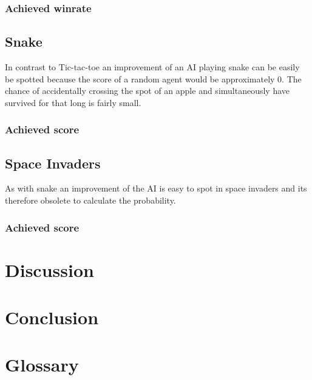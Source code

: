 \documentclass[12pt]{article}
\begin{document}
\subsubsection{Achieved winrate}
\subsection{Snake}
In contrast to Tic-tac-toe an improvement of an AI playing snake can be easily be spotted because the score of a random agent would be approximately $0$. The chance of accidentally crossing the spot of an apple and simultaneously have survived for that long is fairly small.   
\subsubsection{Achieved score}
\subsection{Space Invaders}
As with snake an improvement of the AI is easy to spot in space invaders and its therefore obsolete to calculate the probability. 
\subsubsection{Achieved score}
\section{Discussion}
\section{Conclusion}
\section{Glossary}


\newpage

\listoffigures
\end{document}
